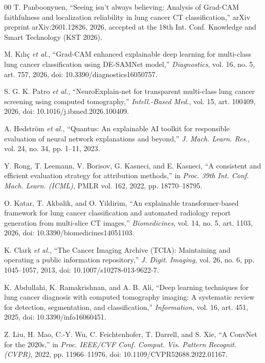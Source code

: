 \documentclass[conference]{IEEEtran}
\begin{document}
\begin{thebibliography}{00}
 T. Panboonyuen, ``Seeing isn't always believing: Analysis of Grad-CAM faithfulness and localization reliability in lung cancer CT classification,'' arXiv preprint arXiv:2601.12826, 2026, accepted at the 18th Int. Conf. Knowledge and Smart Technology (KST 2026).

 M. K{\i}l{\i}{\c{c}} \emph{et al.}, ``Grad-CAM enhanced explainable deep learning for multi-class lung cancer classification using DE-SAMNet model,'' \textit{Diagnostics}, vol. 16, no. 5, art. 757, 2026, doi: 10.3390/diagnostics16050757.

 S. G. K. Patro \emph{et al.}, ``NeuroExplain-net for transparent multi-class lung cancer screening using computed tomography,'' \textit{Intell.-Based Med.}, vol. 15, art. 100409, 2026, doi: 10.1016/j.ibmed.2026.100409.

 A. Hedstr{\"o}m \emph{et al.}, ``Quantus: An explainable AI toolkit for responsible evaluation of neural network explanations and beyond,'' \textit{J. Mach. Learn. Res.}, vol. 24, no. 34, pp. 1--11, 2023.

 Y. Rong, T. Leemann, V. Borisov, G. Kasneci, and E. Kasneci, ``A consistent and efficient evaluation strategy for attribution methods,'' in \textit{Proc. 39th Int. Conf. Mach. Learn. (ICML)}, PMLR vol. 162, 2022, pp. 18770--18795.

 O. Katar, T. Akbalik, and O. Yildirim, ``An explainable transformer-based framework for lung cancer classification and automated radiology report generation from multi-slice CT images,'' \textit{Biomedicines}, vol. 14, no. 5, art. 1103, 2026, doi: 10.3390/biomedicines14051103.

 K. Clark \emph{et al.}, ``The Cancer Imaging Archive (TCIA): Maintaining and operating a public information repository,'' \textit{J. Digit. Imaging}, vol. 26, no. 6, pp. 1045--1057, 2013, doi: 10.1007/s10278-013-9622-7.

 K. Abdullahi, K. Ramakrishnan, and A. B. Ali, ``Deep learning techniques for lung cancer diagnosis with computed tomography imaging: A systematic review for detection, segmentation, and classification,'' \textit{Information}, vol. 16, art. 451, 2025, doi: 10.3390/info16060451.

 Z. Liu, H. Mao, C.-Y. Wu, C. Feichtenhofer, T. Darrell, and S. Xie, ``A ConvNet for the 2020s,'' in \textit{Proc. IEEE/CVF Conf. Comput. Vis. Pattern Recognit. (CVPR)}, 2022, pp. 11966--11976, doi: 10.1109/CVPR52688.2022.01167.


\end{thebibliography}
\end{document}

